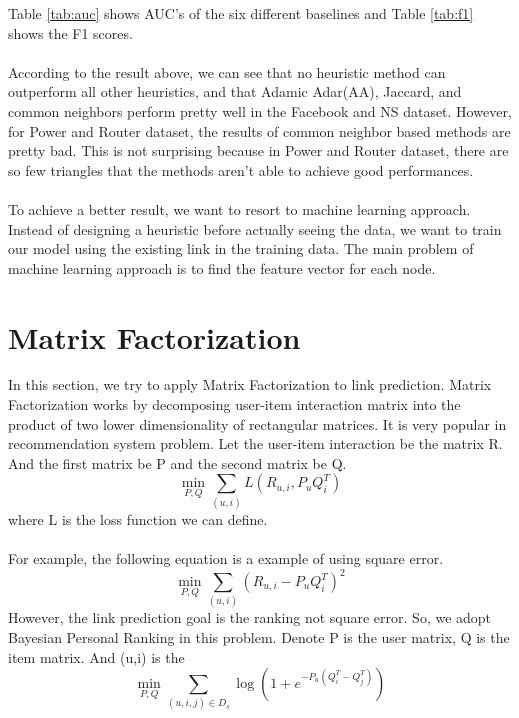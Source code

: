 \documentclass[12pt]{article}
\begin{document}
Table \ref{tab:auc} shows AUC's of the six different baselines and Table \ref{tab:f1} shows the F1 scores.
\\
\\
According to the result above, we can see that no heuristic method can outperform all other heuristics, and that Adamic Adar(AA), Jaccard, and common neighbors perform pretty well in the Facebook and NS dataset. However, for Power and Router dataset, the results of common neighbor based methods are pretty bad. This is not surprising because in Power and Router dataset, there are so few triangles that the methods aren't able to achieve good performances. 
\\
\\
To achieve a better result, we want to resort to machine learning approach. Instead of designing a heuristic before actually seeing the data, we want to train our model using the existing link in the training data. The main problem of machine learning approach is to find the feature vector for each node. 

\section{Matrix Factorization}

In this section, we try to apply Matrix Factorization to link prediction. Matrix Factorization works by decomposing user-item interaction matrix into the product of two lower dimensionality of rectangular matrices. It is very popular in recommendation system problem. Let the user-item interaction be the matrix R. And the first matrix be P and the second matrix be Q.  
\\
\begin{equation}
\min_{P,Q}{\sum_{(u,i)}{L(R_{u,i}, P_uQ_i^T)}}
\end{equation}
where L is the loss function we can define. \\
\\
For example, the following equation is a example of using square error. \\
\begin{equation}
\min_{P,Q}{\sum_{(u,i)}{(R_{u,i}-P_uQ_i^T)^2}}
\end{equation}
However, the link prediction goal is the ranking not square error. So, we adopt Bayesian Personal Ranking\cite{bpr} in this problem. Denote P is the user matrix, Q is the item matrix. And (u,i) is the 
\begin{equation}
\min_{P,Q} \sum_{(u,i,j)\in D_s}\log(1+e^{-P_u(Q_i^T - Q_j^T)})
\end{equation}
\end{document}
